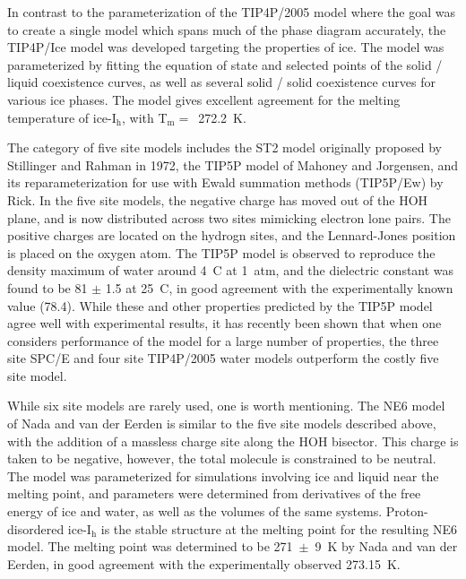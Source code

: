 In contrast to the parameterization of the TIP4P/2005 model where the
goal was to create a single model which spans much of the phase
diagram accurately, the TIP4P/Ice model was developed targeting the
properties of ice. The model was parameterized by fitting the equation
of state and selected points of the solid / liquid coexistence curves,
as well as several solid / solid coexistence curves for various ice
phases. The model gives excellent agreement for the melting
temperature of ice-I$_\mathrm{h}$, with T$_\mathrm{m} = $~272.2~K.

The category of five site models includes the ST2 model originally
proposed by Stillinger and Rahman in 1972\cite{Stillinger1974}, the
TIP5P model of Mahoney and Jorgensen\cite{Mahoney2000}, and its
reparameterization for use with Ewald summation methods (TIP5P/Ew) by
Rick.\cite{Rick2004} In the five site models, the negative charge has
moved out of the HOH plane, and is now distributed across two sites
mimicking electron lone pairs. The positive charges are located on
the hydrogn sites, and the Lennard-Jones position is placed on the
oxygen atom. The TIP5P model is observed to reproduce the density
maximum of water around 4\degree~C at 1~atm, and the dielectric
constant was found to be 81 $\pm$ 1.5 at 25\degree~C, in good
agreement with the experimentally known value (78.4). While these and
other properties predicted by the TIP5P model agree well with
experimental results, it has recently been shown that when one
considers performance of the model for a large number of properties,
the three site SPC/E and four site TIP4P/2005 water models outperform
the costly five site model. \cite{Vega2011a}

While six site models are rarely used, one is worth mentioning. The
NE6 model of Nada and van der Eerden is similar to the five site
models described above, with the addition of a massless charge site
along the HOH bisector.\cite{Nada2003a} This charge is taken to be
negative, however, the total molecule is constrained to be
neutral. The model was parameterized for simulations involving ice and
liquid near the melting point, and parameters were determined from
derivatives of the free energy of ice and water, as well as the
volumes of the same systems. Proton-disordered ice-I$_\mathrm{h}$ is
the stable structure at the melting point for the resulting NE6
model. The melting point was determined to be 271~$\pm$~9~K by Nada
and van der Eerden, in good agreement with the experimentally observed
273.15~K.

